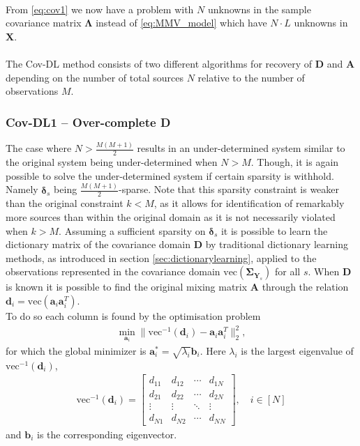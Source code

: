 \\
From \eqref{eq:cov1} we now have a problem with $N$ unknowns in the sample covariance matrix $\boldsymbol{\Lambda}$ instead of \eqref{eq:MMV_model} which have $N \cdot L$ unknowns in $\mathbf{X}$.
\\ \\
The Cov-DL method consists of two different algorithms for  recovery of $\mathbf{D}$ and $\mathbf{A}$ depending on the number of total sources $N$ relative to the number of observations $M$. 

\subsubsection*{Cov-DL1 -- Over-complete \textbf{D}}
The case where $N > \frac{M(M+1)}{2}$ results in an under-determined system similar to the original system being under-determined when $N>M$. 
Though, it is again possible to solve the under-determined system if certain sparsity is withhold. Namely $\boldsymbol{\delta}_s$ being $\frac{M(M+1)}{2}$-sparse. Note that this sparsity constraint is  weaker than the original constraint $k < M$, as it allows for identification of remarkably more sources than within the original domain as it is not necessarily violated when $k > M$.
Assuming a sufficient sparsity on $\boldsymbol{\delta}_s$ it is possible to learn the dictionary matrix of the covariance domain $\mathbf{D}$ by traditional dictionary learning methods, as introduced in section \ref{sec:dictionarylearning}, applied to the observations represented in the covariance domain $\text{vec}(\boldsymbol{\Sigma}_{\mathbf{Y}_s})$ for all $s$. When $\mathbf{D}$ is known it is possible to find the original mixing matrix $\mathbf{A}$ through the relation $\mathbf{d}_i = \text{vec}(\mathbf{a}_i \mathbf{a}_i^T)$.
\\
To do so each column is found by the optimisation problem 
\begin{align*}
\min_{\textbf{a}_i} \| \text{vec}^{-1}(\textbf{d}_i) -\textbf{a}_i\textbf{a}_i^T\|_2^2, 
\end{align*}
for which the global minimizer is $\mathbf{a}^{\ast}_i=\sqrt{\lambda_i} \textbf{b}_i$. Here $\lambda_i$ is the largest eigenvalue of $\text{vec}^{-1}(\textbf{d}_i)$,
\begin{align*}
\text{vec}^{-1}(\textbf{d}_i) = 
\begin{bmatrix}
d_{11} & d_{12} & \cdots & d_{1N} \\
d_{21} & d_{22} & \cdots & d_{2N} \\
\vdots & \vdots & \ddots & \vdots \\
d_{N1} & d_{N2} & \cdots & d_{NN}
\end{bmatrix}, \quad i \in [N]
\end{align*}
and $\textbf{b}_i$ is the corresponding eigenvector.
  
